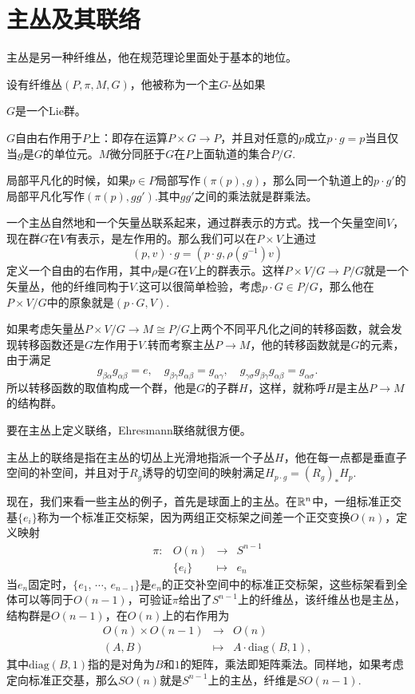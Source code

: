 \section{主丛及其联络}
主丛是另一种纤维丛，他在规范理论里面处于基本的地位。
\begin{defi}
	设有纤维丛$(P,\pi,M,G)$，他被称为一个主$G$-丛如果

	 $G$是一个Lie群。

	 $G$自由右作用于$P$上：即存在运算$P\times G\to P$，并且对任意的$p$成立$p\cdot g=p$当且仅当$g$是$G$的单位元。$M$微分同胚于$G$在$P$上面轨道的集合$P/G$.

	 局部平凡化的时候，如果$p\in P$局部写作$(\pi(p),g)$，那么同一个轨道上的$p\cdot g'$的局部平凡化写作$(\pi(p),gg')$.其中$gg'$之间的乘法就是群乘法。
\end{defi}

一个主丛自然地和一个矢量丛联系起来，通过群表示的方式。找一个矢量空间$V$，现在群$G$在$V$有表示，是左作用的。那么我们可以在$P\times V$上通过
\[
	(p,v)\cdot g=(p\cdot g,\rho(g^{-1})v)
\]
定义一个自由的右作用，其中$\rho$是$G$在$V$上的群表示。这样$P\times V/G\to P/G$就是一个矢量丛，他的纤维同构于$V$.这可以很简单检验，考虑$p\cdot G\in P/G$，那么他在$P\times V/G$中的原象就是$(p\cdot G,V)$.

如果考虑矢量丛$P\times V/G\to M\cong P/G$上两个不同平凡化之间的转移函数，就会发现转移函数还是$G$左作用于$V$.转而考察主丛$P\to M$，他的转移函数就是$G$的元素，由于满足
\begin{equation*}
	g_{\beta\alpha}g_{\alpha\beta}=e,\quad g_{\beta\gamma}g_{\alpha\beta}=g_{\alpha\gamma},\quad g_{\gamma\sigma}g_{\beta\gamma}g_{\alpha\beta}=g_{\alpha\sigma}.
\end{equation*}
所以转移函数的取值构成一个群，他是$G$的子群$H$，这样，就称呼$H$是主丛$P\to M$的结构群。

要在主丛上定义联络，Ehresmann联络就很方便。
\begin{defi}
主丛上的联络是指在主丛的切丛上光滑地指派一个子丛$H$，他在每一点都是垂直子空间的补空间，并且对于$R_g$诱导的切空间的映射满足$H_{p\cdot g}=(R_g)_*H_p$.
\end{defi}

现在，我们来看一些主丛的例子，首先是球面上的主丛。在$\mathbb{R}^n$中，一组标准正交基$\{e_i\}$称为一个标准正交标架，因为两组正交标架之间差一个正交变换$O(n)$，定义映射
\[
	\begin{array}{lccl}
		\pi:&O(n)&\to &S^{n-1}\\
		&\{e_i\}&\mapsto&e_n
	\end{array}
\]
当$e_n$固定时，$\{e_1$, $\cdots$, $e_{n-1}\}$是$e_n$的正交补空间中的标准正交标架，这些标架看到全体可以等同于$O(n-1)$，可验证$\pi$给出了$S^{n-1}$上的纤维丛，该纤维丛也是主丛，结构群是$O(n-1)$，在$O(n)$上的右作用为
\[
	\begin{array}{lcl}
		O(n)\times O(n-1)&\to& O(n)\\
		(A,B)&\mapsto& A\cdot \mathrm{diag}(B,1),
	\end{array}
\]
其中$\mathrm{diag}(B,1)$指的是对角为$B$和$1$的矩阵，乘法即矩阵乘法。同样地，如果考虑定向标准正交基，那么$SO(n)$就是$S^{n-1}$上的主丛，纤维是$SO(n-1)$.

